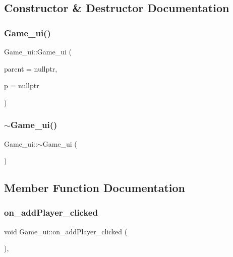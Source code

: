 \subsection{Constructor \& Destructor Documentation}
\mbox{\label{class_game__ui_abad4919c9b6622e654abfe39d8a616fa}} 
\subsubsection{\texorpdfstring{Game\+\_\+ui()}{Game\_ui()}}
{\footnotesize\ttfamily Game\+\_\+ui\+::\+Game\+\_\+ui (\begin{DoxyParamCaption}\item[{Q\+Widget $\ast$}]{parent = {\ttfamily nullptr},  }\item[{std\+::shared\+\_\+ptr$<$ \hyperlink{class_game}{Game} $>$}]{p = {\ttfamily nullptr} }\end{DoxyParamCaption})\hspace{0.3cm}{\ttfamily [explicit]}}

\mbox{\label{class_game__ui_a57edf1bb7a598f494736343d7ea2ecfe}} 
\subsubsection{\texorpdfstring{$\sim$\+Game\+\_\+ui()}{~Game\_ui()}}
{\footnotesize\ttfamily Game\+\_\+ui\+::$\sim$\+Game\+\_\+ui (\begin{DoxyParamCaption}{ }\end{DoxyParamCaption})}



\subsection{Member Function Documentation}
\mbox{\label{class_game__ui_ac51a9a1bf2ef83a4a95312265cee4741}} 
\subsubsection{\texorpdfstring{on\+\_\+add\+Player\+\_\+clicked}{on\_addPlayer\_clicked}}
{\footnotesize\ttfamily void Game\+\_\+ui\+::on\+\_\+add\+Player\+\_\+clicked (\begin{DoxyParamCaption}{ }\end{DoxyParamCaption})\hspace{0.3cm}{\ttfamily [private]}, {\ttfamily [slot]}}



